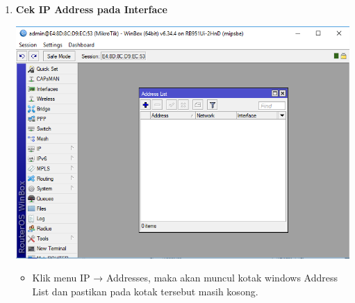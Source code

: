 \documentclass[a4paper,12pt]{article}
\begin{document}
\begin{enumerate}[label=\textbf{\arabic*.}]
\begin{itemize}
        \end{itemize}

    \item \textbf{Cek IP Address pada Interface\\}
        \begin{center}
            \includegraphics[width=0.8\linewidth]{image2.png}
        \end{center}
        \begin{itemize}
            \item Klik menu IP → Addresses, maka akan muncul kotak windows Address List dan pastikan pada kotak tersebut masih kosong.
        \end{itemize}


\end{enumerate}
\end{document}
